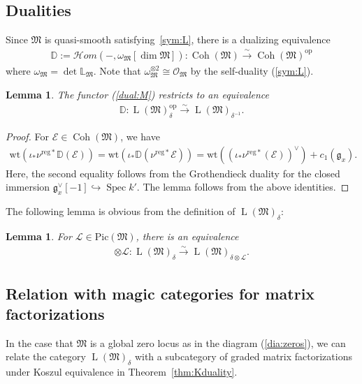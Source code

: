 \documentclass [11pt,oneside,a4paper,mathscr]{amsart}
\newtheorem{lemma}[thm]{Lemma}
\theoremstyle{definition}
\newcommand{\LL}{\operatorname{L}}
\newcommand{\Coh}{\operatorname{Coh}}
\newcommand{\Spec}{\operatorname{Spec}}
\newcommand{\wt}{\mathrm{wt}}
\begin{document}
\subsection{Dualities}
Since $\mathfrak{M}$ is quasi-smooth satisfying~\eqref{sym:L}, there is a dualizing equivalence
\begin{align}\label{dual:M}
    \mathbb{D}:=\mathcal{H}om(-, \omega_{\mathfrak{M}}[\dim \mathfrak{M}]) \colon \Coh(\mathfrak{M}) \stackrel{\sim}{\to} \Coh(\mathfrak{M})^{\mathrm{op}}
\end{align}
where $\omega_{\mathfrak{M}}=\det \mathbb{L}_{\mathfrak{M}}$. 
Note that $\omega_{\mathfrak{M}}^{\otimes 2} \cong \mathcal{O}_{\mathfrak{M}}$ 
by the self-duality (\ref{sym:L}). 
\begin{lemma}\label{lem:duality}
The functor (\ref{dual:M}) restricts to an equivalence 
\begin{align*}
\mathbb{D} \colon \LL(\mathfrak{M})_{\delta}^{\mathrm{op}} \stackrel{\sim}{\to} \LL(\mathfrak{M})_{\delta^{-1}}. 
\end{align*}
\end{lemma}
\begin{proof}
    For $\mathcal{E} \in \Coh(\mathfrak{M})$, we have 
    \begin{align*}
        \wt(\iota_{\ast}\nu^{\mathrm{reg}\ast}\mathbb{D}(\mathcal{E}))
        =\wt(\iota_{\ast}\mathbb{D}(\nu^{\mathrm{reg}\ast}\mathcal{E})) 
        =\wt((\iota_{\ast}\nu^{\mathrm{reg}\ast}(\mathcal{E}))^{\vee})+c_1 (\mathfrak{g}_x). 
    \end{align*}
    Here, the second equality follows from the Grothendieck duality for the closed immersion 
    $\mathfrak{g}_x^{\vee}[-1] \hookrightarrow \Spec k'$. 
    The lemma follows from the above identities. 
\end{proof}

The following lemma is obvious from the definition of $\LL(\mathfrak{M})_{\delta}$:
\begin{lemma}\label{lem:tensor}
For $\mathcal{L} \in \mathrm{Pic}(\mathfrak{M})$, there is an equivalence 
\begin{align*}
    \otimes \mathcal{L} \colon \LL(\mathfrak{M})_{\delta} \stackrel{\sim}{\to}
    \LL(\mathfrak{M})_{\delta \otimes \mathcal{L}}.
\end{align*}
\end{lemma}


\subsection{Relation with magic categories for matrix factorizations}\label{subsec:magic}
In the case that $\mathfrak{M}$ is a global zero locus as in the diagram (\ref{dia:zeros}), 
we can relate the category $\LL(\mathfrak{M})_{\delta}$ with a subcategory 
of graded matrix factorizations under Koszul equivalence in Theorem~\ref{thm:Kduality}.
\end{document}
